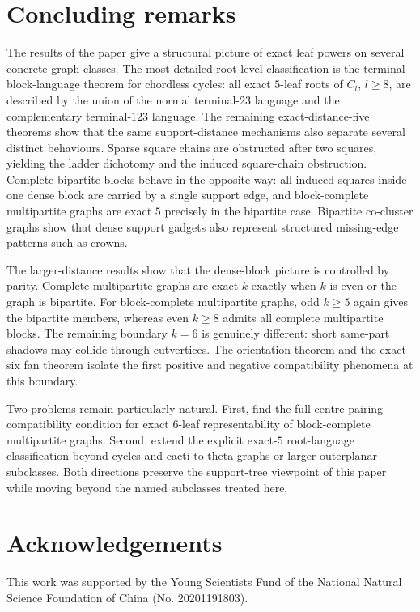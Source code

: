 \documentclass[11pt]{article}
\theoremstyle{definition}
\begin{document}
\section{Concluding remarks}

The results of the paper give a structural picture of exact leaf powers on several concrete graph classes.  The most detailed root-level classification is the terminal block-language theorem for chordless cycles: all exact $5$-leaf roots of $C_l$, $l\ge8$, are described by the union of the normal terminal-$23$ language and the complementary terminal-$123$ language.  The remaining exact-distance-five theorems show that the same support-distance mechanisms also separate several distinct behaviours.  Sparse square chains are obstructed after two squares, yielding the ladder dichotomy and the induced square-chain obstruction.  Complete bipartite blocks behave in the opposite way: all induced squares inside one dense block are carried by a single support edge, and block-complete multipartite graphs are exact $5$ precisely in the bipartite case.  Bipartite co-cluster graphs show that dense support gadgets also represent structured missing-edge patterns such as crowns.

The larger-distance results show that the dense-block picture is controlled by parity.  Complete multipartite graphs are exact $k$ exactly when $k$ is even or the graph is bipartite.  For block-complete multipartite graphs, odd $k\ge5$ again gives the bipartite members, whereas even $k\ge8$ admits all complete multipartite blocks.  The remaining boundary $k=6$ is genuinely different: short same-part shadows may collide through cutvertices.  The orientation theorem and the exact-six fan theorem isolate the first positive and negative compatibility phenomena at this boundary.

Two problems remain particularly natural.  First, find the full centre-pairing compatibility condition for exact $6$-leaf representability of block-complete multipartite graphs.  Second, extend the explicit exact-$5$ root-language classification beyond cycles and cacti to theta graphs or larger outerplanar subclasses.  Both directions preserve the support-tree viewpoint of this paper while moving beyond the named subclasses treated here.

\section*{Acknowledgements}
This work was supported by the Young Scientists Fund of the National Natural Science Foundation of China (No. 20201191803).
\end{document}
